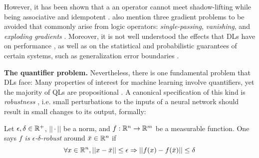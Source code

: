 

However, it has been shown that a an operator cannot meet shadow-lifting while being associative and idempotent \citep{varnai2020robustness}. \citeauthor{van2022analyzing} also mention three gradient problems to be avoided that commonly arise from logic operators: \emph{single-passing}, \emph{vanishing}, and \emph{exploding gradients} \citep{van2022analyzing}. Moreover, it is not well understood the effects that DLs have on performance \citep{flinkow2025generalised}, as well as on the statistical and probabilistic guarantees of certain systems, such as generalization error boundaries \citep{jakubovitz2019generalization}.


\textbf{The quantifier problem.} Nevertheless, there is one fundamental problem that DLs face: Many properties of interest for machine learning involve quantifiers, yet the majority of QLs are propositional \citep{bacci2024polynomial, bacci2023propositional, bacci2025induction}. A canonical specification of this kind is  \textit{robustness} \citep{casadio2022neural},  i.e. small perturbations to the inputs of a neural network should result in small changes to its output, formally:
\begin{definition} %
\label{Robustness}%
    Let $\epsilon, \delta \in \mathbb{R}^+$, $||\cdot||$ be a norm, and $f : \mathbb{R}^n \rightarrow \mathbb{R}^m$ be a measurable function.
    One says \textit{$f$ is $\epsilon$-$\delta$-robust} around $\bar x \in \mathbb{R} ^ n$ if 
    \begin{equation}
    \label{eq:robustness}
        \forall x\in \mathbb{R}^n , ||x - \bar x|| \leq \epsilon \Rightarrow || 
			f(x) - f(\bar x)|| \leq \delta  
    \end{equation}
\end{definition}

